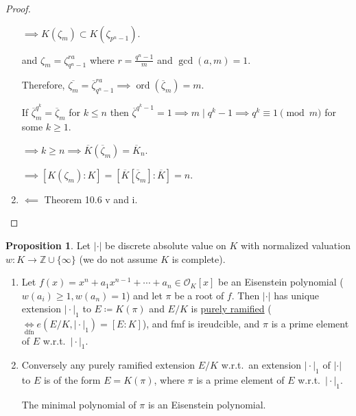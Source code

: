 \documentclass[openany]{amsbook}
\numberwithin{section}{chapter}
\theoremstyle{definition}
\newtheorem{proposition}[theorem]{Proposition}
\begin{document}
\begin{proof}
\begin{enumerate}[label=\roman*)]
        \(\implies K(\zeta_m) \subset K(\zeta_{p^n - 1})\).

        and \(\zeta_m = \zeta_{q^n - 1}^{ra}\) where \(r = \frac{q^n - 1}{m}\) and \(\gcd(a,m) = 1\).

        Therefore, \(\overline{\zeta_m} = \overline{\zeta}_{q^n - 1}^{ra} \implies \operatorname{ord}(\overline{\zeta}_m) = m\).

        If \(\overline{\zeta}_m^{q^k} = \overline{\zeta}_m\) for \(k \leq n\) then \(\overline{\zeta}^{q^k - 1} = 1 \implies m \mid q^k - 1 \implies q^k \equiv 1\pmod m\) for some \(k \geq 1\).
        
        \(\implies k \geq n \implies \overline{K}(\overline{\zeta}_m) = \overline{K}_n\).
        
        \(\implies [K(\zeta_m) : K] = [\overline{K}[\overline{\zeta}_m]:\overline{K}] = n \).
        
        \item \(\impliedby\) Theorem 10.6 v and i.
    \end{enumerate} 
\end{proof}

\begin{proposition}
    Let \(\vert \cdot \vert\) be discrete absolute value on \(K\) with normalized valuation \(w:K \to \mathbb{Z} \cup \{ \infty \} \) (we do not assume \(K\) is complete).

    \begin{enumerate}[label=\roman*)]
        \item Let \(f(x) = x^n + a_1 x^{n-1} + \cdots +a_n \in \mathcal{O}_K [x]\) be an Eisenstein polynomial (\(w(a_i) \geq 1, w(a_n) = 1\)) and let \(\pi\) be a root of \(f\). Then  \(\vert \cdot \vert\) has unique extension \(\vert \cdot \vert_1\) to \(E \coloneqq K(\pi)\) and \(E / K\) is \underline{purely ramified} (\(\underset{\text{dfn}}{\iff} e(E / K, \vert \cdot \vert_1) = [E:K]\)), and fmf\(\) is ireudcible, and \(\pi\) is a prime element of \(E\) w.r.t.\ \(\vert \cdot \vert_1\).
        \item Conversely any purely ramified extension \(E / K\) w.r.t.\ an extension \(\vert \cdot \vert_1\) of \(\vert \cdot \vert\) to \(E\) is of the form \(E = K(\pi)\), where \(\pi\) is a prime element of \(E\) w.r.t.\ \(\vert \cdot \vert_1\).
        
        The minimal polynomial of \(\pi\) is an Eisenstein polynomial.
    \end{enumerate} 
\end{proposition}
\end{document}
